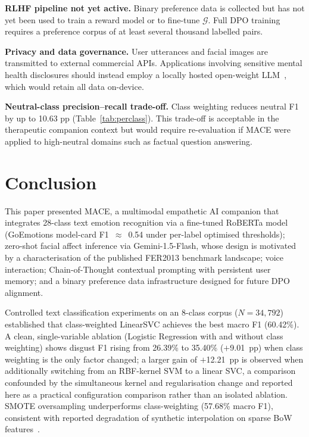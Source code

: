 \documentclass[sigconf, review=true]{acmart}
\begin{document}
\textbf{RLHF pipeline not yet active.}
Binary preference data is collected but has not yet been
used to train a reward model or to fine-tune $\mathcal{G}$.
Full DPO training~\cite{rafailov2023dpo} requires a preference
corpus of at least several thousand labelled pairs.

\textbf{Privacy and data governance.}
User utterances and facial images are transmitted to external
commercial APIs.
Applications involving sensitive mental health disclosures
should instead employ a locally hosted open-weight
LLM~\cite{ouyang2022rlhf}, which would retain all data
on-device.

\textbf{Neutral-class precision--recall trade-off.}
Class weighting reduces neutral F1 by up to 10.63 pp
(Table~\ref{tab:perclass}).
This trade-off is acceptable in the therapeutic companion
context but would require re-evaluation if MACE were applied
to high-neutral domains such as factual question answering.

\section{Conclusion}
\label{sec:conclusion}

This paper presented MACE, a multimodal empathetic AI companion
that integrates 28-class text emotion recognition via a
fine-tuned RoBERTa model (GoEmotions model-card F1~$\approx$~0.54
under per-label optimised thresholds); zero-shot facial affect
inference via Gemini-1.5-Flash, whose design is motivated by a
characterisation of the published FER2013 benchmark landscape;
voice interaction; Chain-of-Thought contextual prompting with
persistent user memory; and a binary preference data
infrastructure designed for future DPO alignment.

Controlled text classification experiments on an 8-class corpus
($N{=}34{,}792$) established that class-weighted LinearSVC
achieves the best macro F1 (60.42\%).
A clean, single-variable ablation (Logistic Regression with and
without class weighting) shows disgust F1 rising from 26.39\% to
35.40\% ($+$9.01~pp) when class weighting is the only factor
changed; a larger gain of $+$12.21~pp is observed when
additionally switching from an RBF-kernel SVM to a linear SVC,
a comparison confounded by the simultaneous kernel and
regularisation change and reported here as a practical
configuration comparison rather than an isolated ablation.
SMOTE oversampling underperforms class-weighting (57.68\%
macro F1), consistent with reported degradation of synthetic
interpolation on sparse BoW features~\cite{blagus2013smote}.
\end{document}
